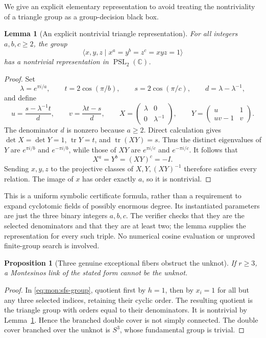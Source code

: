 \documentclass[11pt,a4paper]{article}
\newtheorem{lemma}[theorem]{Lemma}
\newtheorem{proposition}[theorem]{Proposition}
\theoremstyle{definition}
\theoremstyle{remark}
\numberwithin{equation}{section}
\begin{document}
We give an explicit elementary representation to avoid treating the
nontriviality of a triangle group as a group-decision black box.

\begin{lemma}[An explicit nontrivial triangle representation]
\label{lem:mon:triangle}
For all integers $a,b,c\ge2$, the group
\[
 \langle x,y,z\mid x^a=y^b=z^c=xyz=1\rangle
\]
has a nontrivial representation in $\operatorname{PSL}_2(\mathbb C)$.
\end{lemma}

\begin{proof}
Set
\[
 \lambda=e^{\pi i/a},\qquad t=2\cos(\pi/b),\qquad
 s=2\cos(\pi/c),\qquad d=\lambda-\lambda^{-1},
\]
and define
\[
 u=\frac{s-\lambda^{-1}t}{d},\qquad
 v=\frac{\lambda t-s}{d},\qquad
 X=\begin{pmatrix}\lambda&0\\0&\lambda^{-1}\end{pmatrix},\qquad
 Y=\begin{pmatrix}u&1\\uv-1&v\end{pmatrix}.
\]
The denominator $d$ is nonzero because $a\ge2$.  Direct calculation gives
$\det X=\det Y=1$, $\operatorname{tr}Y=t$, and
$\operatorname{tr}(XY)=s$.  Thus the distinct eigenvalues of $Y$ are
$e^{\pi i/b}$ and $e^{-\pi i/b}$, while those of $XY$ are
$e^{\pi i/c}$ and $e^{-\pi i/c}$.  It follows that
\[
 X^a=Y^b=(XY)^c=-I.
\]
Sending $x,y,z$ to the projective classes of $X,Y,(XY)^{-1}$ therefore
satisfies every relation.  The image of $x$ has order exactly $a$, so it is
nontrivial.
\end{proof}

This is a uniform symbolic certificate formula, rather than a requirement to
expand cyclotomic fields of possibly enormous degree.  Its instantiated
parameters are just the three binary integers $a,b,c$.  The verifier checks
that they are the selected denominators and that they are at least two; the
lemma supplies the representation for every such triple.  No numerical cosine
evaluation or unproved finite-group search is involved.

\begin{proposition}[Three genuine exceptional fibers obstruct the unknot]
\label{prop:mon:three}
If $r\ge3$, a Montesinos link of the stated form cannot be the unknot.
\end{proposition}

\begin{proof}
In \eqref{eq:mon:sfs-group}, quotient first by $h=1$, then by $x_i=1$ for
all but any three selected indices, retaining their cyclic order.  The resulting
quotient is the triangle group with orders equal to their denominators.
It is nontrivial by Lemma~\ref{lem:mon:triangle}.  Hence the branched double
cover is not simply connected.  The double cover branched over the unknot
is $S^3$, whose fundamental group is trivial.
\end{proof}
\end{document}

